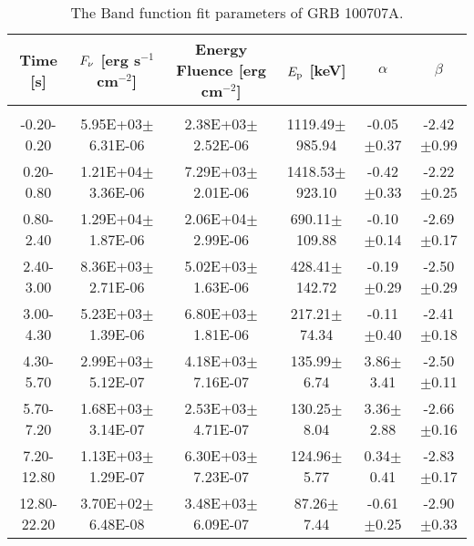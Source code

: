 \begin{table}[h]
\centering
\scriptsize
\label{tab:}
\begin{tabular}{c| c c c c c}
Time [s] & $F_{\nu}$ [erg s$^{-1}$ cm$^{-2}$] & Energy Fluence [erg cm$^{-2}$] & $E_{\rm p}$ [keV] & $\alpha$ & $\beta$ \\
\hline \hline\\ 

-0.20-0.20 & 5.95E+03$\pm$6.31E-06 & 2.38E+03$\pm$2.52E-06 & 1119.49$\pm$985.94 & -0.05$\pm$0.37 & -2.42$\pm$0.99 \\ 

0.20-0.80 & 1.21E+04$\pm$3.36E-06 & 7.29E+03$\pm$2.01E-06 & 1418.53$\pm$923.10 & -0.42$\pm$0.33 & -2.22$\pm$0.25 \\ 

0.80-2.40 & 1.29E+04$\pm$1.87E-06 & 2.06E+04$\pm$2.99E-06 & 690.11$\pm$109.88 & -0.10$\pm$0.14 & -2.69$\pm$0.17 \\ 

2.40-3.00 & 8.36E+03$\pm$2.71E-06 & 5.02E+03$\pm$1.63E-06 & 428.41$\pm$142.72 & -0.19$\pm$0.29 & -2.50$\pm$0.29 \\ 

3.00-4.30 & 5.23E+03$\pm$1.39E-06 & 6.80E+03$\pm$1.81E-06 & 217.21$\pm$74.34 & -0.11$\pm$0.40 & -2.41$\pm$0.18 \\ 

4.30-5.70 & 2.99E+03$\pm$5.12E-07 & 4.18E+03$\pm$7.16E-07 & 135.99$\pm$6.74 & 3.86$\pm$3.41 & -2.50$\pm$0.11 \\ 

5.70-7.20 & 1.68E+03$\pm$3.14E-07 & 2.53E+03$\pm$4.71E-07 & 130.25$\pm$8.04 & 3.36$\pm$2.88 & -2.66$\pm$0.16 \\ 

7.20-12.80 & 1.13E+03$\pm$1.29E-07 & 6.30E+03$\pm$7.23E-07 & 124.96$\pm$5.77 & 0.34$\pm$0.41 & -2.83$\pm$0.17 \\ 

12.80-22.20 & 3.70E+02$\pm$6.48E-08 & 3.48E+03$\pm$6.09E-07 & 87.26$\pm$7.44 & -0.61$\pm$0.25 & -2.90$\pm$0.33 \\ 

\end{tabular}
\caption{The Band function fit parameters of GRB 100707A.}
\end{table}

